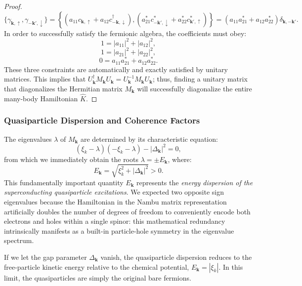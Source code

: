 \begin{proof}
\[    \]
    \[
        \{ \gamma_{\mathbf{k},\uparrow}, \gamma_{-\mathbf{k}',\downarrow} \} = \left\{ \left(a_{11} c_{\mathbf{k},\uparrow} + a_{12} c_{-\mathbf{k},\downarrow}^\dagger\right), \left(a_{21}^* c_{-\mathbf{k}',\downarrow}^* + a_{22}^* c_{\mathbf{k}',\uparrow}^*\right) \right\} = (a_{11} a_{21}^* + a_{12} a_{22}^*) \delta_{\mathbf{k},-\mathbf{k}'}.
    \]
    In order to successfully satisfy the fermionic algebra, the coefficients must obey:
    \[
        1 = |a_{11}|^2 + |a_{12}|^2,
    \]
    \[
        1 = |a_{21}|^2 + |a_{22}|^2,
    \]
    \[
        0 = a_{11} a_{21}^* + a_{12} a_{22}^*.
    \]
    These three constraints are automatically and exactly satisfied by unitary matrices. This implies that \( U_{\mathbf{k}}^\dagger M_{\mathbf{k}} U_{\mathbf{k}} = U_{\mathbf{k}}^{-1} M_{\mathbf{k}} U_{\mathbf{k}} \); thus, finding a unitary matrix that diagonalizes the Hermitian matrix \( M_{\mathbf{k}} \) will successfully diagonalize the entire many-body Hamiltonian \( \hat{K} \).
\end{proof}

\subsubsection{Quasiparticle Dispersion and Coherence Factors}

The eigenvalues \( \lambda \) of \( M_{\mathbf{k}} \) are determined by its characteristic equation:
\[
    (\xi_k - \lambda)(-\xi_k - \lambda) - |\Delta_{\mathbf{k}}|^2 = 0,
\]
from which we immediately obtain the roots \( \lambda = \pm E_{\mathbf{k}} \), where:
\begin{equation} \label{eq:quasiparticle_dispersion}
    E_{\mathbf{k}} = \sqrt{\xi_k^2 + |\Delta_{\mathbf{k}}|^2} > 0.
\end{equation}
This fundamentally important quantity \( E_{\mathbf{k}} \) represents the \textit{energy dispersion of the superconducting quasiparticle excitations}. We expected two opposite sign eigenvalues because the Hamiltonian in the Nambu matrix representation artificially doubles the number of degrees of freedom to conveniently encode both electrons and holes within a single spinor: this mathematical redundancy intrinsically manifests as a built-in particle-hole symmetry in the eigenvalue spectrum.

If we let the gap parameter \( \Delta_{\mathbf{k}} \) vanish, the quasiparticle dispersion reduces to the free-particle kinetic energy relative to the chemical potential, \( E_{\mathbf{k}} = |\xi_k| \). In this limit, the quasiparticles are simply the original bare fermions.

